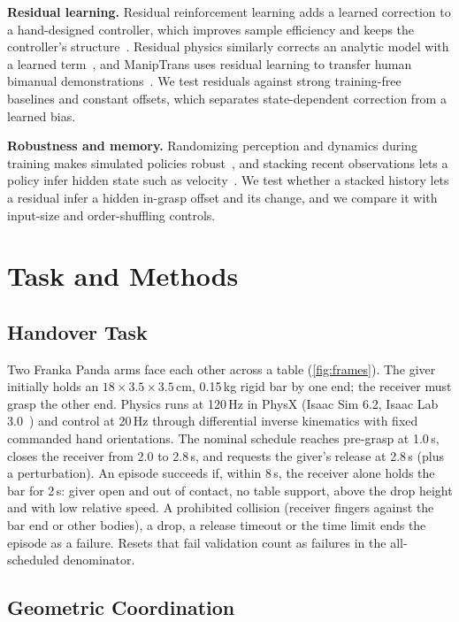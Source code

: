 \documentclass[conference,letterpaper]{IEEEtran}
\begin{document}
\textbf{Residual learning.} Residual reinforcement learning adds a learned correction to a hand-designed
controller, which improves sample efficiency and keeps the controller's structure~\cite{johannink2019residual,
silver2018residual}. Residual physics similarly corrects an analytic model with a learned term~\cite{zeng2020tossingbot},
and ManipTrans uses residual learning to transfer human bimanual demonstrations~\cite{li2025maniptrans}. We test
residuals against strong training-free baselines and constant offsets, which separates state-dependent correction
from a learned bias.

\textbf{Robustness and memory.} Randomizing perception and dynamics during training makes simulated policies
robust~\cite{tobin2017domain,peng2018dynamics}, and stacking recent observations lets a policy infer hidden state
such as velocity~\cite{mnih2015dqn}. We test whether a stacked history lets a residual infer a hidden in-grasp
offset and its change, and we compare it with input-size and order-shuffling controls.

\section{Task and Methods}

\subsection{Handover Task}
\label{sec:task}

Two Franka Panda arms face each other across a table (\cref{fig:frames}). The giver initially holds an
$18\times3.5\times3.5$\,cm, 0.15\,kg rigid bar by one end; the receiver must grasp the other end. Physics runs at
120\,Hz in PhysX (Isaac Sim 6.2, Isaac Lab 3.0~\cite{mittal2025isaaclab}) and control at 20\,Hz through
differential inverse kinematics with fixed commanded hand orientations. The nominal schedule reaches pre-grasp at
1.0\,s, closes the receiver from 2.0 to 2.8\,s, and requests the giver's release at 2.8\,s (plus a perturbation).
An episode succeeds if, within 8\,s, the receiver alone holds the bar for 2\,s: giver open and out of contact, no
table support, above the drop height and with low relative speed. A prohibited collision (receiver fingers against
the bar end or other bodies), a drop, a release timeout or the time limit ends the episode as a failure. Resets
that fail validation count as failures in the all-scheduled denominator.

\subsection{Geometric Coordination}
\end{document}
